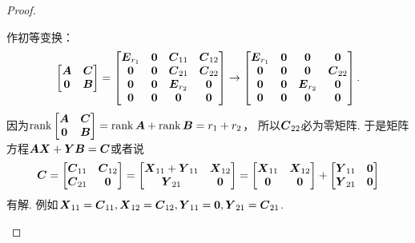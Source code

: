 \begin{example}
\begin{proof}
\begin{itemize}
	作初等变换：\begin{equation*}
		\begin{bmatrix}
			\boldsymbol{A} & \boldsymbol{C} \\
			\boldsymbol0 & \boldsymbol{B}
		\end{bmatrix}
		= \begin{bmatrix}
			\boldsymbol{E}_{r_1} & \boldsymbol0 & \boldsymbol{C}_{11} & \boldsymbol{C}_{12} \\
			\boldsymbol0 & \boldsymbol0 & \boldsymbol{C}_{21} & \boldsymbol{C}_{22} \\
			\boldsymbol0 & \boldsymbol0 & \boldsymbol{E}_{r_2} & \boldsymbol0 \\
			\boldsymbol0 & \boldsymbol0 & \boldsymbol0 & \boldsymbol0
		\end{bmatrix}
		\to \begin{bmatrix}
			\boldsymbol{E}_{r_1} & \boldsymbol0 & \boldsymbol0 & \boldsymbol0 \\
			\boldsymbol0 & \boldsymbol0 & \boldsymbol0 & \boldsymbol{C}_{22} \\
			\boldsymbol0 & \boldsymbol0 & \boldsymbol{E}_{r_2} & \boldsymbol0 \\
			\boldsymbol0 & \boldsymbol0 & \boldsymbol0 & \boldsymbol0
		\end{bmatrix}.
	\end{equation*}
	因为\(\rank\begin{bmatrix}
		\boldsymbol{A} & \boldsymbol{C} \\
		\boldsymbol0 & \boldsymbol{B}
	\end{bmatrix}
	= \rank \boldsymbol{A} + \rank \boldsymbol{B}
	= r_1 + r_2\)，
	所以\(\boldsymbol{C}_{22}\)必为零矩阵.
	于是矩阵方程\(\boldsymbol{A}\boldsymbol{X}+\boldsymbol{Y}\boldsymbol{B}=\boldsymbol{C}\)或者说\begin{equation*}
		\boldsymbol{C} = \begin{bmatrix}
			\boldsymbol{C}_{11} & \boldsymbol{C}_{12} \\
			\boldsymbol{C}_{21} & \boldsymbol0
		\end{bmatrix}
		= \begin{bmatrix}
			\boldsymbol{X}_{11} + \boldsymbol{Y}_{11} & \boldsymbol{X}_{12} \\
			\boldsymbol{Y}_{21} & \boldsymbol0
		\end{bmatrix}
		= \begin{bmatrix}
			\boldsymbol{X}_{11} & \boldsymbol{X}_{12} \\
			\boldsymbol0 & \boldsymbol0
		\end{bmatrix}
		+ \begin{bmatrix}
			\boldsymbol{Y}_{11} & \boldsymbol0 \\
			\boldsymbol{Y}_{21} & \boldsymbol0
		\end{bmatrix}
	\end{equation*}有解.
	例如\(\boldsymbol{X}_{11} = \boldsymbol{C}_{11}, \boldsymbol{X}_{12} = \boldsymbol{C}_{12}, \boldsymbol{Y}_{11} = \boldsymbol0, \boldsymbol{Y}_{21} = \boldsymbol{C}_{21}\).
	\qedhere
\end{itemize}
\end{proof}
\end{example}


